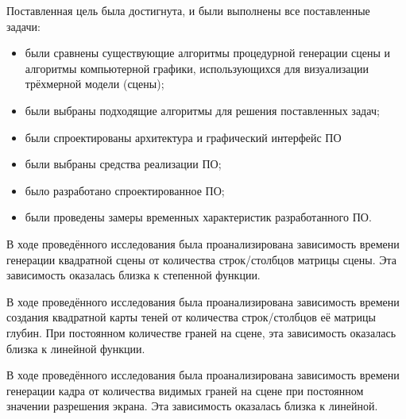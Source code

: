
Поставленная цель была достигнута, и были выполнены все поставленные задачи:
\begin{itemize}
  \item были сравнены существующие алгоритмы процедурной генерации сцены и алгоритмы компьютерной графики, использующихся для визуализации трёхмерной модели (сцены);
  \item были выбраны подходящие алгоритмы для решения поставленных задач;
  \item были спроектированы архитектура и графический интерфейс ПО
  \item были выбраны средства реализации ПО;
  \item было разработано спроектированное ПО;
  \item были проведены замеры временных характеристик разработанного ПО.
\end{itemize}

В ходе проведённого исследования была проанализирована зависимость времени генерации квадратной сцены от количества строк/столбцов матрицы сцены. Эта зависимость оказалась близка к степенной функции.

В ходе проведённого исследования была проанализирована зависимость времени создания квадратной карты теней от количества строк/столбцов её матрицы глубин. При постоянном количестве граней на сцене, эта зависимость оказалась близка к линейной функции.

В ходе проведённого исследования была проанализирована зависимость времени генерации кадра от количества видимых граней на сцене при постоянном значении разрешения экрана. Эта зависимость оказалась близка к линейной.
